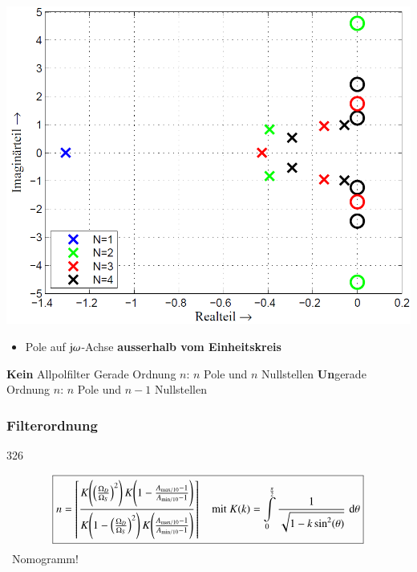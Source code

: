 \begin{minipage}[c]{0.4\columnwidth}
    \includegraphics[width=\columnwidth]{images/filter_cauer_pollage.png}
    \begin{itemize}
        \item Pole auf $\mathrm{j} \omega$-Achse \textbf{ausserhalb vom Einheitskreis}
    \end{itemize}
\end{minipage}
\hfill
\begin{minipage}[c]{0.58\columnwidth}
    \begin{outline}
        \1 \textbf{Kein} Allpolfilter
            \2 Gerade Ordnung $n$: $n$ Pole und $n$ Nullstellen
            \2 \textbf{Un}gerade Ordnung $n$: $n$ Pole und $n-1$ Nullstellen
    \end{outline}
\end{minipage}


\subsubsection{Filterordnung}{326}

$$ \boxed{ n = \left\lceil \frac{ K \Bigg( \Big( \frac{\Omega_D}{\Omega_S} \Big)^2 \Bigg) \, K \Bigg( 1 - \frac{A_{\rm max / 10} - 1}{A_{\rm min / 10} - 1} \Bigg) }
    { K \Bigg( 1 -\Big( \frac{\Omega_D}{\Omega_S} \Big)^2 \Bigg) \, K \Bigg(\frac{A_{\rm max / 10} - 1}{A_{\rm min / 10} - 1} \Bigg) }  \right\rceil 
    \quad \text{mit } K(k) = \int\limits_{0}^{\frac{\pi}{2} }  \frac{1}{\sqrt{1- k \sin^2(\theta)}} \, \mathop{} \! \mathrm{d} \theta }$$
    \textrightarrow\ Nomogramm!


